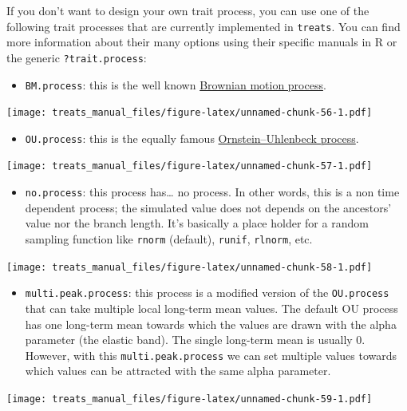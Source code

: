 \documentclass[
]{book}
\providecommand{\tightlist}{%
  \setlength{\itemsep}{0pt}\setlength{\parskip}{0pt}}
\begin{document}
If you don't want to design your own trait process, you can use one of the following trait processes that are currently implemented in \texttt{treats}. You can find more information about their many options using their specific manuals in R or the generic \texttt{?trait.process}:

\begin{itemize}
\tightlist
\item
  \texttt{BM.process}: this is the well known \href{https://en.wikipedia.org/wiki/Brownian_motion}{Brownian motion process}.
\end{itemize}

\texttt{[image: treats\_manual\_files/figure-latex/unnamed-chunk-56-1.pdf]}

\begin{itemize}
\tightlist
\item
  \texttt{OU.process}: this is the equally famous \href{https://en.wikipedia.org/wiki/Ornstein\%E2\%80\%93Uhlenbeck_process}{Ornstein--Uhlenbeck process}.
\end{itemize}

\texttt{[image: treats\_manual\_files/figure-latex/unnamed-chunk-57-1.pdf]}

\begin{itemize}
\tightlist
\item
  \texttt{no.process}: this process has\ldots{} no process. In other words, this is a non time dependent process; the simulated value does not depends on the ancestors' value nor the branch length. It's basically a place holder for a random sampling function like \texttt{rnorm} (default), \texttt{runif}, \texttt{rlnorm}, etc.
\end{itemize}

\texttt{[image: treats\_manual\_files/figure-latex/unnamed-chunk-58-1.pdf]}

\begin{itemize}
\tightlist
\item
  \texttt{multi.peak.process}: this process is a modified version of the \texttt{OU.process} that can take multiple local long-term mean values. The default OU process has one long-term mean towards which the values are drawn with the alpha parameter (the elastic band). The single long-term mean is usually 0. However, with this \texttt{multi.peak.process} we can set multiple values towards which values can be attracted with the same alpha parameter.
\end{itemize}

\texttt{[image: treats\_manual\_files/figure-latex/unnamed-chunk-59-1.pdf]}
\end{document}
